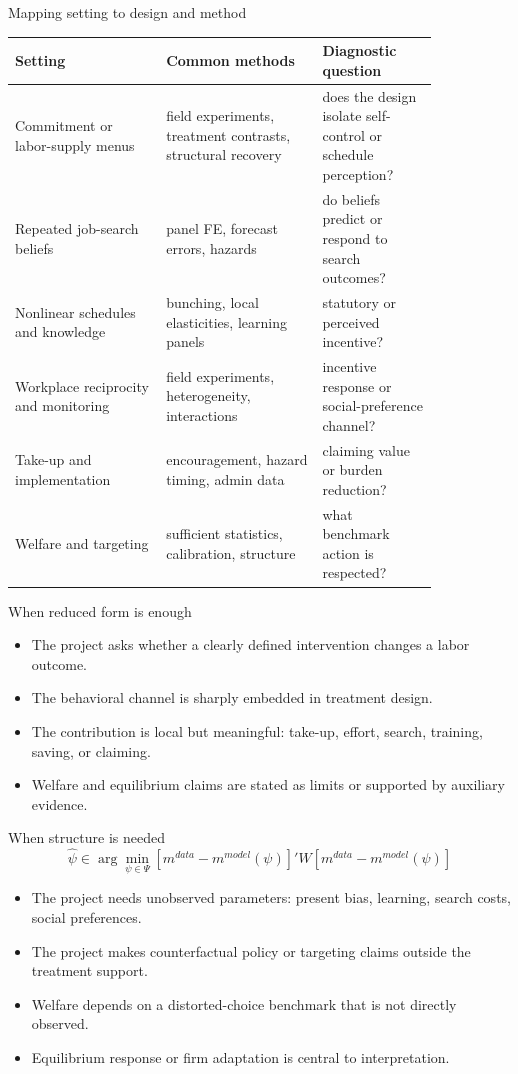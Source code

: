 \documentclass[aspectratio=169,11pt]{beamer}
\begin{document}
\begin{frame}{Mapping setting to design and method}
\scriptsize
\begin{tabular}{p{0.30\linewidth} p{0.31\linewidth} p{0.23\linewidth}}
\toprule
Setting & Common methods & Diagnostic question \\
\midrule
Commitment or labor-supply menus & field experiments, treatment contrasts, structural recovery & does the design isolate self-control or schedule perception? \\
Repeated job-search beliefs & panel FE, forecast errors, hazards & do beliefs predict or respond to search outcomes? \\
Nonlinear schedules and knowledge & bunching, local elasticities, learning panels & statutory or perceived incentive? \\
Workplace reciprocity and monitoring & field experiments, heterogeneity, interactions & incentive response or social-preference channel? \\
Take-up and implementation & encouragement, hazard timing, admin data & claiming value or burden reduction? \\
Welfare and targeting & sufficient statistics, calibration, structure & what benchmark action is respected? \\
\bottomrule
\end{tabular}
\end{frame}

\begin{frame}{When reduced form is enough}
\begin{itemize}
    \item The project asks whether a clearly defined intervention changes a labor outcome.
    \item The behavioral channel is sharply embedded in treatment design.
    \item The contribution is local but meaningful: take-up, effort, search, training, saving, or claiming.
    \item Welfare and equilibrium claims are stated as limits or supported by auxiliary evidence.
\end{itemize}
\end{frame}

\begin{frame}{When structure is needed}
\[
\hat \psi \in \arg\min_{\psi \in \Psi}
\left[m^{data}-m^{model}(\psi)\right]'W\left[m^{data}-m^{model}(\psi)\right]
\]

\begin{itemize}
    \item The project needs unobserved parameters: present bias, learning, search costs, social preferences.
    \item The project makes counterfactual policy or targeting claims outside the treatment support.
    \item Welfare depends on a distorted-choice benchmark that is not directly observed.
    \item Equilibrium response or firm adaptation is central to interpretation.
\end{itemize}
\end{frame}
\end{document}
